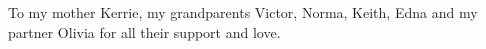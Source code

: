 \vspace*{7cm}
\begin{center}
To my mother Kerrie, my grandparents Victor, Norma, Keith, Edna and my partner Olivia for all their support and love. 
\end{center}
